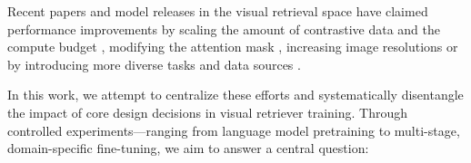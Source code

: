 Recent papers and model releases in the visual retrieval space have claimed performance improvements by scaling the amount of contrastive data and the compute budget , modifying the attention mask , increasing image resolutions  or by introducing more diverse tasks and data sources . %



In this work, we attempt to centralize these efforts and systematically disentangle the impact of core design decisions in visual retriever training. 
Through controlled experiments—ranging from language model pretraining to multi-stage, domain-specific fine-tuning, we aim to answer a central question:

